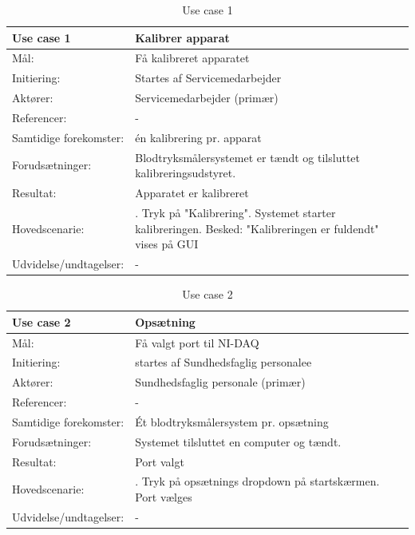 \begin{table}[H]
\caption{Use case 1}\label{tab:tabel3}
\begin{tabular}{| l | >{\raggedright\arraybackslash}p{11cm} |}
   \hline
   \textbf{Use case 1} & \textbf{Kalibrer apparat}\\ \hline
   Mål: & Få kalibreret apparatet \\ \hline
   Initiering: & Startes af Servicemedarbejder\\ \hline
   Aktører:& Servicemedarbejder (primær)\\ \hline
   Referencer: & - \\ \hline
   Samtidige forekomster: & én kalibrering pr. apparat \\\hline
   Forudsætninger: & Blodtryksmålersystemet er tændt og tilsluttet kalibreringsudstyret.\\ \hline
   Resultat:& Apparatet er kalibreret\\ \hline
   Hovedscenarie:& 
1. Tryk på "Kalibrering"\newline
2. Systemet starter kalibreringen\newline
3. Besked: "Kalibreringen er fuldendt" vises på GUI\\\hline
Udvidelse/undtagelser: & - \\\hline
\end{tabular}
\end{table}

\begin{table}[H]
\caption{Use case 2}\label{tab:tabel3}
\begin{tabular}{| l | >{\raggedright\arraybackslash}p{11cm} |}
   \hline
   \textbf{Use case 2} & \textbf{Opsætning}\\ \hline
   Mål: & Få valgt port til NI-DAQ \\ \hline
   Initiering: & startes af Sundhedsfaglig personalee\\ \hline
   Aktører:& Sundhedsfaglig personale (primær) \\ \hline
   Referencer: &  -\\ \hline
   Samtidige forekomster: & Ét blodtryksmålersystem pr. opsætning \\\hline
   Forudsætninger: & Systemet tilsluttet en computer og tændt. \\ \hline
   Resultat:& Port valgt\\ \hline
   Hovedscenarie:& 
1. Tryk på opsætnings dropdown på startskærmen\newline
2. Port vælges \\\hline
Udvidelse/undtagelser: & -\\\hline
\end{tabular}
\end{table}



